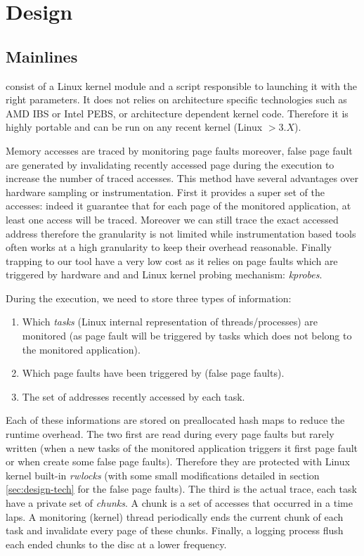\section{Design}
\label{sec:design}

\subsection{Mainlines}

\Moca consist of a Linux kernel module and a script responsible to launching it
with the right parameters. It does not relies on architecture specific
technologies such as AMD IBS or Intel PEBS, or architecture dependent kernel
code. Therefore it is highly portable and can be run on any recent kernel
(Linux $> 3.X$).

Memory accesses are traced by monitoring page faults moreover, false page
fault are generated by invalidating recently accessed page during the
execution to increase the number of traced accesses. This method have several
advantages over hardware sampling or instrumentation. First it provides a
super set of the accesses: indeed it guarantee that for each page of the
monitored application, at least one access will be traced. Moreover we can
still trace the exact accessed address therefore the granularity is not
limited while instrumentation based tools often works at a high granularity to
keep their overhead reasonable.  Finally trapping to our tool have a very low
cost as it relies on page faults which are triggered by hardware and and Linux
kernel probing mechanism: \emph{kprobes}.

During the execution, we need to store three types of information:
\begin{enumerate}
    \item Which \emph{tasks} (Linux internal representation of threads/processes) are
monitored (as page fault will be triggered by tasks which does not belong to
the monitored application).
    \item Which page faults have been triggered by \Moca (false page faults).
    \item The set of addresses recently accessed by each task.
\end{enumerate}
Each of these informations are stored on preallocated hash maps to reduce the
runtime overhead. The two first are read during every page faults but rarely
written (when a new tasks of the monitored application triggers it first page
fault or when \Moca create some false page faults). Therefore they are
protected with Linux kernel built-in \emph{rwlocks} (with some small
modifications detailed in section \ref{sec:design-tech} for the false page
faults). The third is the actual trace, each task have a private set of
\emph{chunks}. A chunk is a set of accesses that occurred in a time laps. A
monitoring (kernel) thread periodically ends the current chunk of each task
and invalidate every page of these chunks. Finally, a logging process flush
each ended chunks to the disc at a lower frequency.

